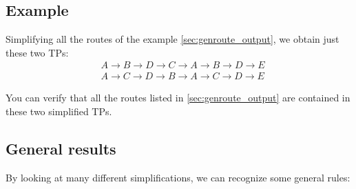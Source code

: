 \documentclass[a4paper]{article}
\begin{document}
\subsection*{Example}
Simplifying all the routes of the example \ref{sec:genroute_output}, we obtain
just these two TPs:
\begin{align}
 &A \rightarrow B \rightarrow D \rightarrow C \rightarrow A \rightarrow B
 \rightarrow D \rightarrow E\\
 &A \rightarrow C \rightarrow D \rightarrow B \rightarrow A \rightarrow C \rightarrow D \rightarrow E
\end{align}

You can verify that all the routes listed in \ref{sec:genroute_output} are
contained in these two simplified TPs.

\subsection{General results}
By looking at many different simplifications, we can recognize some general
rules:
\end{document}
